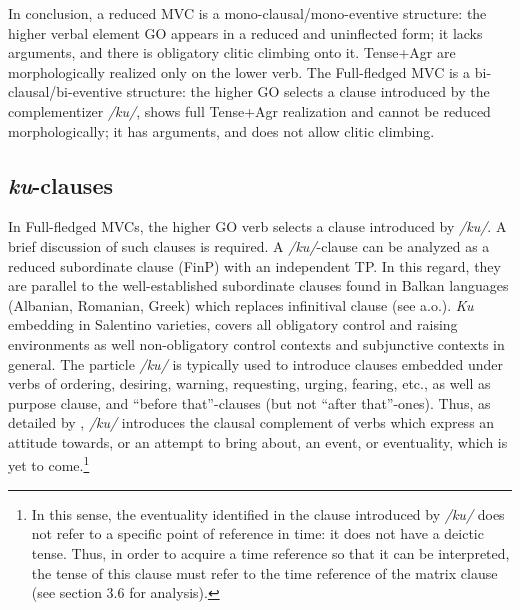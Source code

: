 \documentclass[output=paper]{langscibook}
\begin{document}
\ea \label{ac10}
    \z
\z

In conclusion, a reduced MVC is a mono-clausal\slash mono-eventive structure: the higher verbal element GO appears in a reduced and uninflected form; it lacks arguments, and there is obligatory clitic climbing onto it.   Tense+Agr are morphologically realized only on the lower verb.  The Full-fledged MVC is a bi-clausal\slash bi-eventive structure: the higher GO selects a clause introduced by the complementizer \textit{/ku/}, shows full Tense+Agr realization and cannot be reduced morphologically; it has arguments, and does not allow clitic climbing.

\subsection{\textit{ku}-clauses}

In Full-fledged MVCs, the higher GO verb selects a clause introduced by \textit{/ku/}.  A brief discussion of such clauses is required.  A \textit{/ku/}-clause can be analyzed as a reduced subordinate clause (FinP) with an independent TP.  In this regard, they are parallel to the well-established subordinate clauses found in Balkan languages (Albanian, Romanian, Greek) which replaces infinitival clause (see \citealt{calabrese1993a, rivero1994a, manzini2005a, roberts2003a} a.o.). \textit{Ku} embedding in Salentino varieties, covers all obligatory control and raising environments as well non-obligatory control contexts and subjunctive contexts in general. The particle \textit{/ku/} is typically used to introduce clauses embedded under verbs of ordering, desiring, warning, requesting, urging, fearing, etc., as well as purpose clause, and “before that”-clauses (but not “after that”-ones). Thus, as detailed by \citet{calabrese1993a}, \textit{/ku/} introduces the clausal complement of verbs which express an attitude towards, or an attempt to bring about, an event, or eventuality, which is yet to come.\footnote{In this sense, the eventuality identified in the clause introduced by \textit{/ku/} does not refer to a specific point of reference in time: it does not have a deictic tense.  Thus, in order to acquire a time reference so that it can be interpreted, the tense of this clause must refer to the time reference of the matrix clause (see section 3.6 for analysis).}
\end{document}
